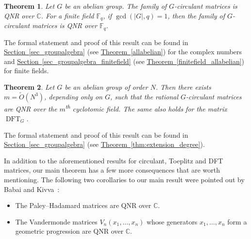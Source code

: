 \documentclass[11pt]{article}
\numberwithin{equation}{section}
\newtheorem{theorem}{Theorem}[section]
\newtheorem{corollary}[theorem]{Corollary}
\theoremstyle{definition}
\theoremstyle{plain}
\newcommand{\C}{\mathbb C}
\newcommand{\expref}[2]{\hyperref[#2]{#1~\ref{#2}}}
\theoremstyle{definition}
\newcommand\F{{\mathbb{F}}}
\renewcommand\C{{\mathbb{C}}}
\newcommand{\ts}{\textsuperscript}
\newcommand{\ignore}[1]{}
\DeclareMathOperator{\DFT}{DFT}
\begin{document}
\begin{theorem}\label{allabelian_intro}
Let $G$ be an abelian group.  The family of $G$-circulant matrices is QNR over $\C$.  For a finite field $\F_q$, if $\gcd(|G|,q) = 1$, then the family of $G$-circulant matrices is QNR over $\F_q$.
\end{theorem}

%
The formal statement and proof of this result can be found in \expref{Section}{sec_groupalgebra} (see \expref{Theorem}{allabelian}) for the complex numbers and \expref{Section}{sec_groupalgebra_finitefield} (see \expref{Theorem}{finitefield_allabelian}) for finite fields.
%

%
\begin{theorem}\label{thm:extension_degree_intro}
Let $G$ be an abelian group of order $N$.  Then there exists
$m = \tilde{O}(N^3)$, depending only on $G$, such that the rational
$G$-circulant matrices are QNR over the $m$\ts{th}
cyclotomic field.  The same also holds for the matrix $\DFT_G$.
\end{theorem}
%

%
The formal statement and proof of this result can be found in \expref{Section}{sec_groupalgebra} (see \expref{Theorem}{thm:extension_degree}).
%

In addition to the aforementioned results for circulant, Toeplitz and
DFT matrices, 
our main theorem has a few more consequences that are worth mentioning.
The following two corollaries to our main result were pointed out 
by Babai and Kivva~\cite{kivva}:
%
\begin{itemize}
\item  The Paley--Hadamard matrices are QNR over $\C$.
\item  The Vandermonde matrices $V_n(x_1, \dots, x_n)$ whose generators
$x_1, \dots, x_n$ form a geometric progression are QNR over $\C$.
\end{itemize}

\ignore{  %
\begin{corollary}
The Paley--Hadamard matrices are QNR over $\C$.
\end{corollary}
%
%
%
%
This result is interesting because the Paley--Hadamard matrices are an exponentially more frequent family of Hadamard matrices than the Walsh--Hadamard matrices. 
\begin{corollary}
Vandermonde matrices $V_n(x_1, \dots, x_n)$ whose generators
$x_1, \dots, x_n$ form a geometric progression are QNR over any
finite field or $\C$.
\end{corollary}

%
%
It has been conjectured that Vandermonde matrices with distinct
generators are rigid.  Our result refutes this conjecture.

%
For the proofs of these two corollaries, see \expref{Section}{sec:kivva}.
}  %
\end{document}
